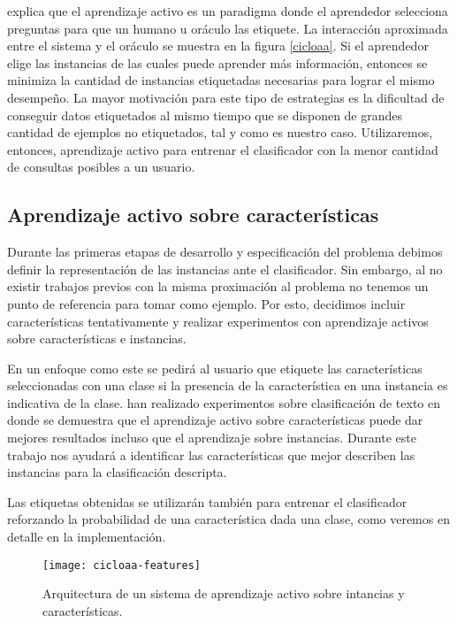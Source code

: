 \citet{settles_active_learning_survey} explica que el aprendizaje activo es un paradigma donde el aprendedor selecciona preguntas para que un humano u oráculo las etiquete. La interacción aproximada entre el sistema y el oráculo se muestra en la figura \ref{cicloaa}. Si el aprendedor elige las instancias de las cuales puede aprender más información, entonces se minimiza la cantidad de instancias etiquetadas necesarias para lograr el mismo desempeño. La mayor motivación para este tipo de estrategias es la dificultad de conseguir datos etiquetados al mismo tiempo que se disponen de grandes cantidad de ejemplos no etiquetados, tal y como es nuestro caso. Utilizaremos, entonces, aprendizaje activo para entrenar el clasificador con la menor cantidad de consultas posibles a un usuario.

\subsection{Aprendizaje activo sobre características}

Durante las primeras etapas de desarrollo y especificación del problema debimos definir la representación de las instancias ante el clasificador. Sin embargo, al no existir trabajos previos con la misma proximación al problema no tenemos un punto de referencia para tomar como ejemplo. Por esto, decidimos incluir características tentativamente y realizar experimentos con aprendizaje activos sobre características e instancias.


En un enfoque como este se pedirá al usuario que etiquete las características seleccionadas con una clase si la presencia de la característica en una instancia es indicativa de la clase. \citet{settles-al-features} han realizado experimentos sobre clasificación de texto en donde se demuestra que el aprendizaje activo sobre características puede dar mejores resultados incluso que el aprendizaje sobre instancias. Durante este trabajo nos ayudará a identificar las características que mejor describen las instancias para la clasificación descripta.

Las etiquetas obtenidas se utilizarán también para entrenar el clasificador reforzando la probabilidad de una característica dada una clase, como veremos en detalle en la implementación.

\begin{figure}[h!]\label{aa-features}
\caption{Arquitectura de un sistema de aprendizaje activo sobre intancias y características.}
\texttt{[image: cicloaa-features]}
\centering
\end{figure}


